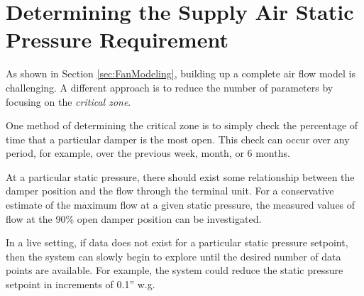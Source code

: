 \section{Determining the Supply Air Static Pressure Requirement}

As shown in Section \ref{sec:FanModeling}, building up a complete air
flow model is challenging. A different approach is to reduce the number
of parameters by focusing on the \textit{critical zone}.

One method of determining the critical zone is to simply check the
percentage of time that a particular damper is the most open. This check
can occur over any period, for example, over the previous week, month,
or 6 months.

At a particular static pressure, there should exist some relationship
between the damper position and the flow through the terminal unit. For
a conservative estimate of the maximum flow at a given static pressure,
the measured values of flow at the 90\% open damper position can be
investigated.

In a live setting, if data does not exist for a particular static
pressure setpoint, then the system can slowly begin to explore until the
desired number of data points are available. For example, the system
could reduce the static pressure setpoint in increments of 0.1'' w.g.




%
%
%
%
%
%
%
%



